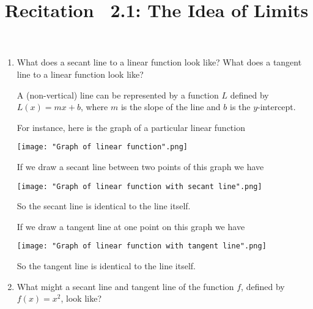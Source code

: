 \documentclass[nooutcomes]{ximera}
\title{Recitation \ 2.1:  The Idea of Limits}
\begin{document}
\begin{abstract}		\end{abstract}
\maketitle


 \begin{problem} \hfil

	\begin{enumerate}

		\item What does a secant line to a linear function look like?  What does a tangent line to a linear function look like? 

 \begin{freeResponse}		 
	
	A (non-vertical) line can be represented by a function $L$ defined by $L(x) = mx + b$, where $m$ is the slope of the line and $b$ is the $y$-intercept.
      
        For instance, here is the graph of a particular linear function
        \begin{image}
          \texttt{[image: "Graph of linear function".png]}
        \end{image}

        If we draw a secant line between two points of this graph we have
        \begin{image}
          \texttt{[image: "Graph of linear function with secant line".png]}
        \end{image}
        So the secant line is identical to the line itself.

        If we draw a tangent line at one point on this graph we have
        \begin{image}
          \texttt{[image: "Graph of linear function with tangent line".png]}
        \end{image}
        So the tangent line is identical to the line itself.
\end{freeResponse}


		\item  What might a secant line and tangent line of the function $f$, defined by $f(x) = x^2$, look like?


\end{enumerate}
\end{problem}
\end{document}
